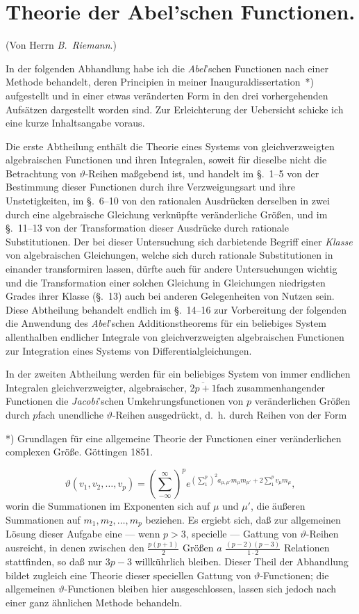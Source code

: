 \documentclass{article}
\begin{document}
\section*{Theorie der Abel'schen Functionen.}

(Von Herrn \emph{B.~Riemann}.)

In der folgenden Abhandlung habe ich die \emph{Abel}'schen Functionen nach einer Methode behandelt, deren Principien in meiner Inauguraldissertation~*) aufgestellt und in einer etwas veränderten Form in den drei vorhergehenden Aufsätzen dargestellt worden sind. Zur Erleichterung der Uebersicht schicke ich eine kurze Inhaltsangabe voraus.

Die erste Abtheilung enthält die Theorie eines Systems von gleichverzweigten algebraischen Functionen und ihren Integralen, soweit für dieselbe nicht die Betrachtung von $\vartheta$-Reihen maßgebend ist, und handelt im §.~1–5 von der Bestimmung dieser Functionen durch ihre Verzweigungsart und ihre Unstetigkeiten, im §.~6–10 von den rationalen Ausdrücken derselben in zwei durch eine algebraische Gleichung verknüpfte veränderliche Größen, und im §.~11–13 von der Transformation dieser Ausdrücke durch rationale Substitutionen. Der bei dieser Untersuchung sich darbietende Begriff einer \emph{Klasse} von algebraischen Gleichungen, welche sich durch rationale Substitutionen in einander transformiren lassen, dürfte auch für andere Untersuchungen wichtig und die Transformation einer solchen Gleichung in Gleichungen niedrigsten Grades ihrer Klasse (§.~13) auch bei anderen Gelegenheiten von Nutzen sein. Diese Abtheilung behandelt endlich im §.~14–16 zur Vorbereitung der folgenden die Anwendung des \emph{Abel}'schen Additionstheorems für ein beliebiges System allenthalben endlicher Integrale von gleichverzweigten algebraischen Functionen zur Integration eines Systems von Differentialgleichungen.

In der zweiten Abtheilung werden für ein beliebiges System von immer endlichen Integralen gleichverzweigter, algebraischer, $\overline{2p+1}$fach zusammenhangender Functionen die \emph{Jacobi}'schen Umkehrungsfunctionen von $p$ veränderlichen Größen durch $p$fach unendliche $\vartheta$-Reihen ausgedrückt, d.~h. durch Reihen von der Form

*) Grundlagen für eine allgemeine Theorie der Functionen einer veränderlichen complexen Größe. Göttingen 1851.

\[ \vartheta(v_{1}, v_{2}, \ldots, v_{p}) = \left(\sum_{-\infty}^{\infty}\right)^{p} e^{\left(\sum_{1}^{p}\right)^{2} a_{\mu,\mu'} m_{\mu} m_{\mu'} + 2 \sum_{1}^{p} v_{\mu} m_{\mu}}, \]
worin die Summationen im Exponenten sich auf $\mu$ und $\mu'$, die äußeren Summationen auf $m_{1}, m_{2}, \ldots, m_{p}$ beziehen. Es ergiebt sich, daß zur allgemeinen Lösung dieser Aufgabe eine --- wenn $p > 3$, specielle --- Gattung von $\vartheta$-Reihen ausreicht, in denen zwischen den $\frac{p(p+1)}{2}$ Größen $a$ $\frac{(p-2)(p-3)}{1 \cdot 2}$ Relationen stattfinden, so daß nur $3p-3$ willkührlich bleiben. Dieser Theil der Abhandlung bildet zugleich eine Theorie dieser speciellen Gattung von $\vartheta$-Functionen; die allgemeinen $\vartheta$-Functionen bleiben hier ausgeschlossen, lassen sich jedoch nach einer ganz ähnlichen Methode behandeln.
\end{document}
